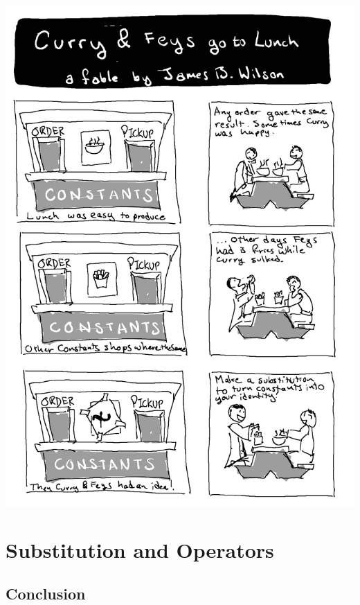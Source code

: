 
\cleardoublepage

\includegraphics[width=\textwidth]{curry-feys.png}

\chapter{Substitution and Operators}





% 

\section*{Conclusion}

